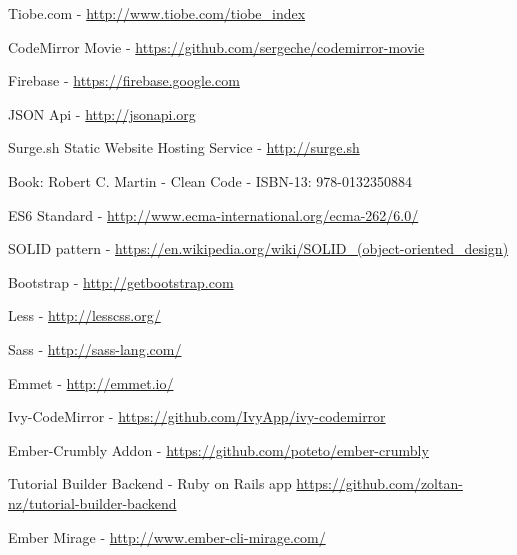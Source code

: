 \documentclass[12pt, a4paper, oneside, openright, medskipamount]{report}
\begin{document}

\backmatter




\begin{thebibliography}{9}

Tiobe.com - \url{http://www.tiobe.com/tiobe_index}

CodeMirror Movie - \url{https://github.com/sergeche/codemirror-movie}

Firebase - \url{https://firebase.google.com}

JSON Api - \url{http://jsonapi.org}

Surge.sh Static Website Hosting Service - \url{http://surge.sh}

Book: Robert C. Martin - Clean Code - ISBN-13: 978-0132350884

ES6 Standard - \url{http://www.ecma-international.org/ecma-262/6.0/}

SOLID pattern - \url{https://en.wikipedia.org/wiki/SOLID_(object-oriented_design)}

Bootstrap - \url{http://getbootstrap.com}

Less - \url{http://lesscss.org/}

Sass - \url{http://sass-lang.com/}

Emmet - \url{http://emmet.io/}

Ivy-CodeMirror - \url{https://github.com/IvyApp/ivy-codemirror}

Ember-Crumbly Addon - \url{https://github.com/poteto/ember-crumbly}

Tutorial Builder Backend - Ruby on Rails app \url{https://github.com/zoltan-nz/tutorial-builder-backend}

Ember Mirage - \url{http://www.ember-cli-mirage.com/}

\end{thebibliography}

\end{document}
